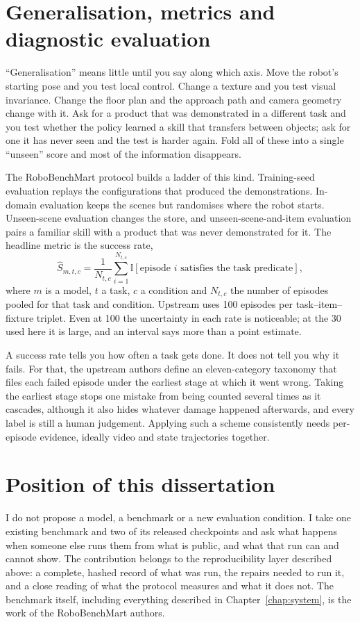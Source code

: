 \section{Generalisation, metrics and diagnostic evaluation}

``Generalisation'' means little until you say along which axis. Move the robot's starting pose and you test local control. Change a texture and you test visual invariance. Change the floor plan and the approach path and camera geometry change with it. Ask for a product that was demonstrated in a different task and you test whether the policy learned a skill that transfers between objects; ask for one it has never seen and the test is harder again. Fold all of these into a single ``unseen'' score and most of the information disappears.

The RoboBenchMart protocol builds a ladder of this kind. Training-seed evaluation replays the configurations that produced the demonstrations. In-domain evaluation keeps the scenes but randomises where the robot starts. Unseen-scene evaluation changes the store, and unseen-scene-and-item evaluation pairs a familiar skill with a product that was never demonstrated for it. The headline metric is the success rate,
\begin{equation}
    \widehat{S}_{m,t,c}=\frac{1}{N_{t,c}}\sum_{i=1}^{N_{t,c}} \mathbb{I}\!\left[\text{episode } i \text{ satisfies the task predicate}\right],
    \label{eq:success-rate}
\end{equation}
where $m$ is a model, $t$ a task, $c$ a condition and $N_{t,c}$ the number of episodes pooled for that task and condition. Upstream uses 100 episodes per task--item--fixture triplet. Even at 100 the uncertainty in each rate is noticeable; at the 30 used here it is large, and an interval says more than a point estimate.

A success rate tells you how often a task gets done. It does not tell you why it fails. For that, the upstream authors define an eleven-category taxonomy that files each failed episode under the earliest stage at which it went wrong. Taking the earliest stage stops one mistake from being counted several times as it cascades, although it also hides whatever damage happened afterwards, and every label is still a human judgement. Applying such a scheme consistently needs per-episode evidence, ideally video and state trajectories together.

\section{Position of this dissertation}

I do not propose a model, a benchmark or a new evaluation condition. I take one existing benchmark and two of its released checkpoints and ask what happens when someone else runs them from what is public, and what that run can and cannot show. The contribution belongs to the reproducibility layer described above: a complete, hashed record of what was run, the repairs needed to run it, and a close reading of what the protocol measures and what it does not. The benchmark itself, including everything described in Chapter~\ref{chap:system}, is the work of the RoboBenchMart authors.

\endgroup
